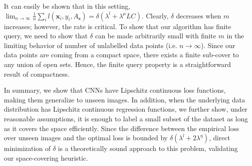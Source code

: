 It can easily be shown that in this setting, $\lim_{n \rightarrow \infty} \frac{1}{n}\sum_i l(\mathbf{x}_i,y_i,A_\mathbf{s}) =    \delta (\lambda^l + \lambda^\mu LC)$. Clearly, $\delta$ decreases when $m$ increases; however, the rate is critical. To show that our algorithm has finite query, we need to show that $\delta$ can be made arbitrarily small with finite $m$ in the limiting behavior of number of unlabelled data points (i.e. $n \rightarrow \infty$). Since our data points are coming from a compact space, there exists a finite sub-cover to any union of open sets. Hence, the finite query property is a straightforward result of compactness. %

\iffalse
\begin{cor}
Given $n$ i.i.d. samples drawn from $p_\mathcal{Z}$ as $\{\mathbf{x}_i,y_i\}_{i\in[n]}$, and a desired error rate $\rho$. If loss function $l(\cdot,y,\mathbf{w})$ is $\lambda^l$-Lipschitz continuous for all $y, \mathbf{w}$, regression function is $\lambda^\eta$-Lipschitz, there exist a finite subset $\mathbf{s}$ with cardinality m such that any CNN achieving $0$ error over $\{\mathbf{x}_{s(j)},y_{s(j)}\}_{j \in [m]}$ achieve the following with probability $1$.
\[
\lim_{n \rightarrow \infty} \frac{1}{n}\sum_i l(\mathbf{x}_i,y_i) \leq \rho %
\]
\label{maincor}
\end{cor}
\fi

In summary, we show that CNNs have Lipschitz continuous loss functions, making them generalize to unseen images. In addition, when the underlying data distribution has Lipschitz continuous regression functions, we further show, under reasonable assumptions, it is enough to label a small subset of the dataset as long as it covers the space efficiently. Since the difference between the empirical loss over unseen images and the optimal loss is bounded by $\delta(\lambda^l + 2 \lambda^{\eta})$, direct minimization of $\delta$ is a theoretically sound approach to this problem, validating our space-covering heuristic.
